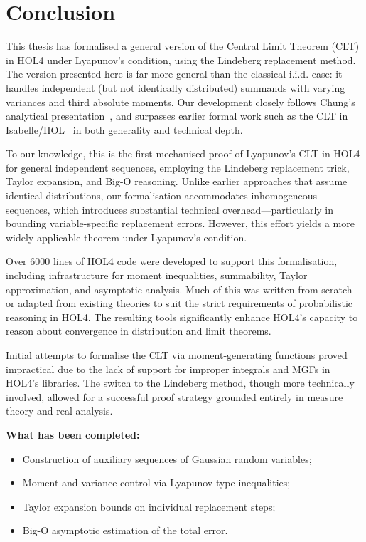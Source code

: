 \chapter{Conclusion}
\label{concl}

This thesis has formalised a general version of the Central Limit Theorem (CLT) in HOL4 under Lyapunov's condition, using the Lindeberg replacement method. The version presented here is far more general than the classical i.i.d. case: it handles independent (but not identically distributed) summands with varying variances and third absolute moments. Our development closely follows Chung's analytical presentation~\cite{Chung:2001}, and surpasses earlier formal work such as the CLT in Isabelle/HOL~\cite{serafin2015formally} in both generality and technical depth.

To our knowledge, this is the first mechanised proof of Lyapunov’s CLT in HOL4 for general independent sequences, employing the Lindeberg replacement trick, Taylor expansion, and Big-O reasoning. Unlike earlier approaches that assume identical distributions, our formalisation accommodates inhomogeneous sequences, which introduces substantial technical overhead—particularly in bounding variable-specific replacement errors. However, this effort yields a more widely applicable theorem under Lyapunov’s condition.

Over 6000 lines of HOL4 code were developed to support this formalisation, including infrastructure for moment inequalities, summability, Taylor approximation, and asymptotic analysis. Much of this was written from scratch or adapted from existing theories to suit the strict requirements of probabilistic reasoning in HOL4. The resulting tools significantly enhance HOL4’s capacity to reason about convergence in distribution and limit theorems.

Initial attempts to formalise the CLT via moment-generating functions proved impractical due to the lack of support for improper integrals and MGFs in HOL4’s libraries. The switch to the Lindeberg method, though more technically involved, allowed for a successful proof strategy grounded entirely in measure theory and real analysis.

\medskip

\textbf{What has been completed:}
\begin{itemize}
    \item Construction of auxiliary sequences of Gaussian random variables;
    \item Moment and variance control via Lyapunov-type inequalities;
    \item Taylor expansion bounds on individual replacement steps;
    \item Big-O asymptotic estimation of the total error.
\end{itemize}

